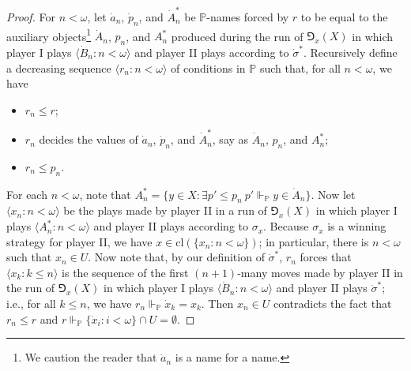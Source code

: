 \documentclass{amsart}
\theoremstyle{definition}
\newcommand{\bb}{\mathbb}
\renewcommand{\P}{\bb{P}}
\begin{document}
\begin{proof}
  For $n < \omega$, let $\dot{a}_n$, $\dot{p}_n$, and $\dot{A}^*_n$ 
  be $\P$-names forced by $r$ to be equal 
  to the auxiliary objects\footnote{We caution the reader that $\dot a_n$ is a name for a name.} $\dot{A}_n$, $p_n$, and $A^*_n$ produced during the run of 
  $\Game_x(X)$ in which player I plays $\langle \dot{B}_n :n < \omega \rangle$ and 
  player II plays according to $\dot{\sigma}^*$. Recursively define a decreasing sequence 
  $\langle r_n :n < \omega \rangle$ of conditions in $\P$ such that, for all $n < \omega$, 
  we have
  \begin{itemize}
    \item $r_n \leq r$;
    \item $r_n$ decides the values of $\dot{a}_n$, $\dot{p}_n$, and $\dot{A}^*_n$, say as 
    $\dot{A}_n$, $p_n$, and $A^*_n$;
    \item $r_n \leq p_n$.
  \end{itemize}
  For each $n < \omega$, note that $A^*_n = \{y \in X :\exists p' \leq p_n \ p' \Vdash_{\P} 
  y \in \dot{A}_n \}$. Now let $\langle x_n :n < \omega \rangle$ be the plays made by player II 
  in a run of $\Game_x(X)$ in which player I plays $\langle A^*_n :n < \omega \rangle$ and 
  player II plays according to $\sigma_x$. Because $\sigma_x$ is a winning strategy for player II, 
  we have $x \in \mathrm{cl}(\{x_n :n < \omega\})$; in particular, there is $n < \omega$ 
  such that $x_n \in U$. Now note that, by our definition of $\dot{\sigma}^*$, $r_n$ forces that 
  $\langle x_k :k \leq n \rangle$ is the sequence of the first $(n+1)$-many moves made 
  by player II in the run of $\Game_x(X)$ in which player I plays $\langle \dot{B}_n :n < 
  \omega \rangle$ and player II plays $\dot{\sigma}^*$; i.e., for all $k \leq n$, we have 
  $r_n \Vdash_{\P} \dot{x}_k = x_k$. Then $x_n \in U$ contradicts the fact that 
  $r_n \leq r$ and $r \Vdash_{\P} \{\dot{x}_i :i < \omega\} \cap U = \emptyset$.
\end{proof}
\end{document}
